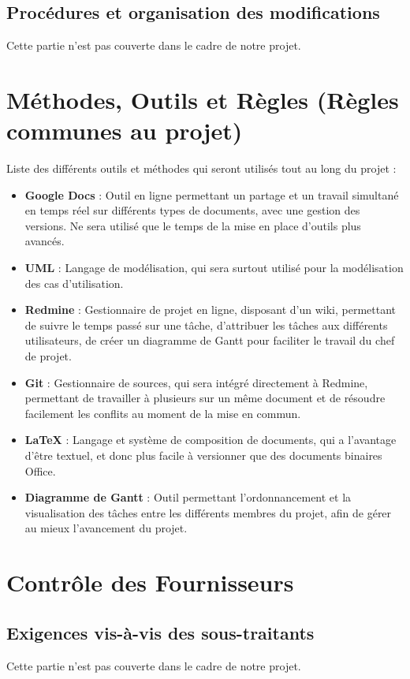 \documentclass[a4paper]{article}
\begin{document}
\subsection{Procédures et organisation des modifications}
Cette partie n'est pas couverte dans le cadre de notre projet.

\section{Méthodes, Outils et Règles (Règles communes au projet)}

Liste des différents outils et méthodes qui seront utilisés tout au long du projet :

\begin{itemize}
\item \textbf{Google Docs} : Outil en ligne permettant un partage et un travail simultané en temps réel sur différents types de documents, avec une gestion des versions. Ne sera utilisé que le temps de la mise en place d'outils plus avancés.
\item \textbf{UML} : Langage de modélisation, qui sera surtout utilisé pour la modélisation des cas d'utilisation.
\item \textbf{Redmine} : Gestionnaire de projet en ligne, disposant d'un wiki, permettant de suivre le temps passé sur une tâche, d'attribuer les tâches aux différents utilisateurs, de créer un  diagramme de Gantt pour faciliter le travail du chef de projet.
\item \textbf{Git} : Gestionnaire de sources, qui sera intégré directement à Redmine, permettant de travailler à plusieurs sur un même document et de résoudre facilement les conflits au moment de la mise en commun.
\item \textbf{LaTeX} : Langage et système de composition de documents, qui a l'avantage d'être textuel, et donc plus facile à versionner que des documents binaires Office.
\item \textbf{Diagramme de Gantt } : Outil permettant l'ordonnancement et la visualisation des tâches entre les différents membres du projet, afin de gérer au mieux l'avancement du projet.
\end{itemize}

\section{Contrôle des Fournisseurs}

\subsection{Exigences vis-à-vis des sous-traitants}
Cette partie n'est pas couverte dans le cadre de notre projet.
\end{document}
